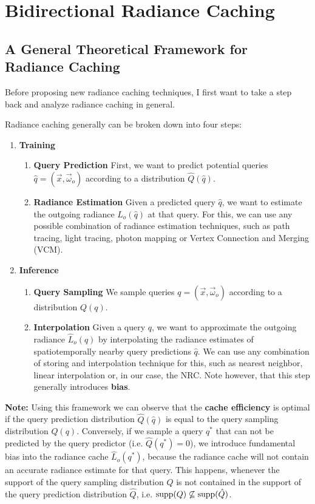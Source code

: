 
\chapter{Bidirectional Radiance Caching}
\label{chap:bidirectional_caching}

\section{A General Theoretical Framework for Radiance Caching}
Before proposing new radiance caching techniques, I first want to take a step back and analyze radiance caching in general.

Radiance caching generally can be broken down into four steps:

\begin{enumerate}
    \item \textbf{Training}
    \begin{enumerate}
        \item \textbf{Query Prediction} First, we want to predict potential queries $\hat{q} = (\vec{x}, \vec{\omega}_o)$ according to a distribution $\hat{Q}(\hat{q})$.
        \item \textbf{Radiance Estimation} Given a predicted query $\hat{q}$, we want to estimate the outgoing radiance $L_o(\hat{q})$ at that query.
        For this, we can use any possible combination of radiance estimation techniques, such as path tracing, light tracing, photon mapping or Vertex Connection and Merging (VCM).
    \end{enumerate}
    \item \textbf{Inference}
    \begin{enumerate}
        \item \textbf{Query Sampling} We sample queries $q = (\vec{x}, \vec{\omega}_o)$ according to a distribution $Q(q)$.
        \item \textbf{Interpolation} Given a query $q$, we want to approximate the outgoing radiance $\hat{L}_o(q)$ by interpolating the radiance estimates of spatiotemporally nearby query predictions $\hat{q}$.
        We can use any combination of storing and interpolation technique for this, such as nearest neighbor, linear interpolation or, in our case, the NRC.
        Note however, that this step generally introduces \textbf{bias}.
    \end{enumerate}
\end{enumerate}

\textbf{Note:} Using this framework we can observe that the \textbf{cache efficiency} is optimal if the query prediction distribution $\hat{Q}(\hat{q})$ is equal to the query sampling distribution $Q(q)$.
Conversely, if we sample a query $q^*$ that can not be predicted by the query predictor (i.e. $\hat{Q}(q^*)=0$), we introduce fundamental bias into the radiance cache $\hat{L}_o(q^*)$, because the radiance cache will not contain an accurate radiance estimate for that query.
This happens, whenever the support of the query sampling distribution $Q$ is not contained in the support of the query prediction distribution $\hat{Q}$, i.e. $\operatorname{\mathrm{supp}}(Q) \not\subseteq \operatorname{\mathrm{supp}}(\hat{Q})$.

